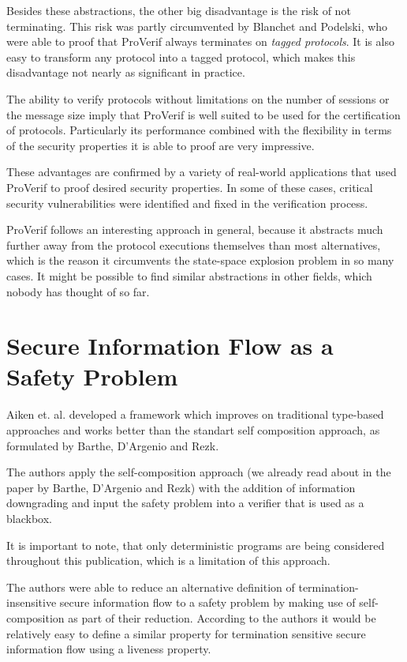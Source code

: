 \documentclass[a4paper,UKenglish]{lipics-v2018}
\begin{document}
Besides these abstractions, the other big disadvantage is the risk of not terminating. This risk was partly circumvented by Blanchet and Podelski, who were able to proof that ProVerif always terminates on \textit{tagged protocols}.\cite{tagging} It is also easy to transform any protocol into a tagged protocol, which makes this disadvantage not nearly as significant in practice.\cite{ProVerif}

The ability to verify protocols without limitations on the number of sessions or the message size imply that ProVerif is well suited to be used for the certification of protocols. Particularly its performance combined with the flexibility in terms of the security properties it is able to proof are very impressive.\cite{ProVerif}

These advantages are confirmed by a variety of real-world applications that used ProVerif to proof desired security properties. In some of these cases, critical security vulnerabilities were identified and fixed in the verification process.

ProVerif follows an interesting approach in general, because it abstracts much further away from the protocol executions themselves than most alternatives, which is the reason it circumvents the state-space explosion problem in so many cases. It might be possible to find similar abstractions in other fields, which nobody has thought of so far.




\section{Secure Information Flow as a Safety Problem}

Aiken et. al. developed a framework which improves on traditional type-based approaches and works better than the standart self composition approach, as formulated by Barthe, D'Argenio and Rezk.\cite{information_flow_by_self_composition}

The authors apply the self-composition approach (we already read about in the paper by Barthe, D'Argenio and Rezk) with the addition of information downgrading and input the safety problem into a verifier that is used as a blackbox.\cite{secure_information_flow_safety}

It is important to note, that only deterministic programs are being considered throughout this publication, which is a limitation of this approach.

The authors were able to reduce an alternative definition of termination-insensitive secure information flow to a safety problem by making use of self-composition as part of their reduction. According to the authors it would be relatively easy to define a similar property for termination sensitive secure information flow using a liveness property.\cite{secure_information_flow_safety}
\end{document}
